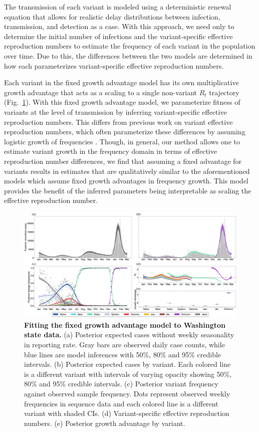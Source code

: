 The transmission of each variant is modeled using a deterministic renewal equation that allows for realistic delay distributions between infection, transmission, and detection as a case.
With this approach, we need only to determine the initial number of infections and the variant-specific effective reproduction numbers to estimate the frequency of each variant in the population over time.
Due to this, the differences between the two models are determined in how each parameterizes variant-specific effective reproduction numbers.

Each variant in the fixed growth advantage model has its own multiplicative growth advantage that acts as a scaling to a single non-variant $R_{t}$ trajectory (Fig.~\ref{fig:fixed_growth_Washington}).
With this fixed growth advantage model, we parameterize fitness of variants at the level of transmission by inferring variant-specific effective reproduction numbers.
This differs from previous work on variant effective reproduction numbers, which often parameterize these differences by assuming logistic growth of frequencies \cite{Earnest2021, vohringer2021genomic}.
Though, in general, our method allows one to estimate variant growth in the frequency domain in terms of effective reproduction number differences, we find that assuming a fixed advantage for variants results in estimates that are qualitatively similar to the aforementioned models which assume fixed growth advantages in frequency growth.
This model provides the benefit of the inferred parameters being interpretable as scaling the effective reproduction number.

\begin{figure}[h!]
  \centering
  \includegraphics[width=\linewidth]{figs/fixed_growth_Washington.png}
  \caption{\textbf{Fitting the fixed growth advantage model to Washington state data.}
  (a) Posterior expected cases without weekly seasonality in reporting rate.
  Gray bars are observed daily case counts, while blue lines are model inferences with 50\%, 80\% and 95\% credible intervals.
  (b) Posterior expected cases by variant.
  Each colored line is a different variant with intervals of varying opacity showing 50\%, 80\% and 95\% credible intervals.
  (c) Posterior variant frequency against observed sample frequency.
  Dots represent observed weekly frequencies in sequence data and each colored line is a different variant with shaded CIs.
  (d) Variant-specific effective reproduction numbers.
  (e) Posterior growth advantage by variant.
  }
  \label{fig:fixed_growth_Washington}
\end{figure}


